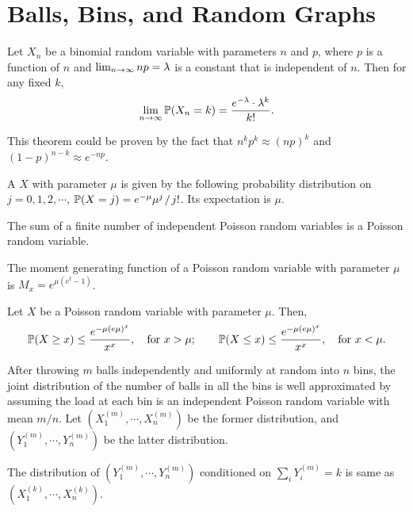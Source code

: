 \documentclass[main.tex]{subfiles}
\begin{document}
\minispacing

\section{Balls, Bins, and Random Graphs}

\begin{theorem}
	Let $X_n$ be a binomial random variable with parameters $n$ and $p$, where $p$ is a function of $n$ and $\lim_{n\rightarrow\infty}np=\lambda$ is a constant that is independent of $n$. Then for any fixed $k$,
	\[
		\lim_{n\rightarrow\infty}\mathbb{P}(X_n=k)=\frac{e^{-\lambda}\cdot\lambda^k}{k!}.
	\]
\end{theorem}

\begin{sketch}
	This theorem could be proven by the fact that $n^{\underline k}p^k\approx (np)^k$ and $(1-p)^{n-k}\approx e^{-np}$.
\end{sketch}

A  $X$ with parameter $\mu$ is given by the following probability distribution on $j=0,1,2,\cdots$, $\mathbb{P}(X=j)=e^{-\mu}\mu^j\;\!/\;\! j!$. Its expectation is $\mu$.

\begin{lemma}
	The sum of a finite number of independent Poisson random variables is a Poisson random variable.
\end{lemma}

\begin{lemma}
	The moment generating function of a Poisson random variable with parameter $\mu$ is $M_x=e^{\mu(e^t-1)}$.
\end{lemma}

\begin{theorem}
	Let $X$ be a Poisson random variable with parameter $\mu$. Then,
	\[
	\mathbb{P}(X\ge x)\le\frac{e^{-\mu(e\mu)^x}}{x^x},\quad \text{for } x>\mu;\qquad \mathbb{P}(X\le x)\le\frac{e^{-\mu(e\mu)^x}}{x^x},\quad\text{for }x<\mu.   
	\]
\end{theorem}

After throwing $m$ balls independently and uniformly at random into $n$ bins, the joint distribution of the number of balls in all the bins is well approximated by assuming the load at each bin is an independent Poisson random variable with mean $m/n$.
Let $(X^{(m)}_1,\cdots,X^{(m)}_n)$ be the former distribution, and $(Y^{(m)}_1,\cdots,Y^{(m)}_n)$ be the latter distribution.

\begin{theorem}
	The distribution of $(Y^{(m)}_1,\cdots,Y^{(m)}_n)$ conditioned on $\sum_{i}Y^{(m)}_i=k$ is same as $(X^{(k)}_1,\cdots,X^{(k)}_n)$.
\end{theorem}
\end{document}
